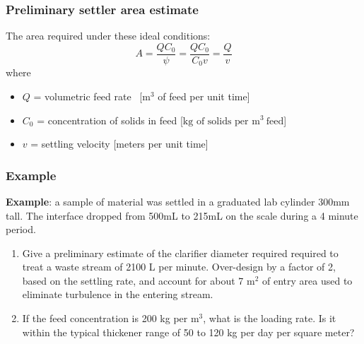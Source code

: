 \begin{frame}\frametitle{Preliminary settler area estimate}
	The area required under these ideal conditions:
	\[
		A = \displaystyle \frac{Q C_0}{\psi} = \displaystyle \frac{Q C_0}{C_0 v} = \displaystyle \frac{Q}{v}
	\]
	where 
	\begin{itemize}
		\item	$Q$ = volumetric feed rate~ [$\text{m}^3$ of feed per unit time]
		\item	$C_0$ = concentration of solids in feed [$\text{kg of solids per~}\text{m}^{3}~\text{feed}$]
		\item	$v$ = settling velocity [meters per unit time]
	\end{itemize}	
\end{frame}

\begin{frame}\frametitle{Example}
	\textbf{Example}: a sample of material was settled in a graduated lab cylinder 300mm tall. The interface dropped from 500mL to 215mL on the scale during a 4 minute period. 
	
	\begin{enumerate}
		\item	Give a preliminary estimate of the clarifier diameter required required to treat a waste stream of 2100 L per minute. Over-design by a factor of 2, based on the settling rate, and account for about 7 $\text{m}^2$ of entry area used to eliminate turbulence in the entering stream.
		\item	If the feed concentration is 200 kg per $\text{m}^3$, what is the loading rate. Is it within the typical thickener range of 50 to 120 kg per day per square meter?
	\end{enumerate}
	
\end{frame}
	
